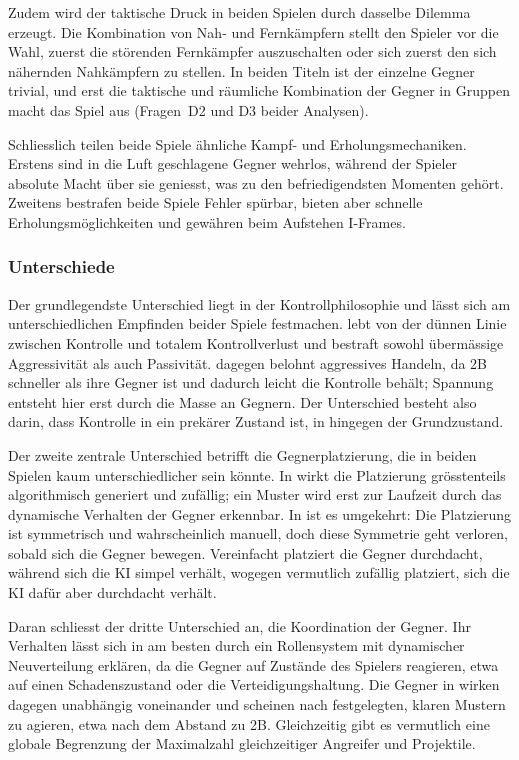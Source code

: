 \documentclass[../Main.tex]{subfiles}
\begin{document}
Zudem wird der taktische Druck in beiden Spielen durch dasselbe Dilemma erzeugt. Die Kombination von Nah- und Fernkämpfern stellt den Spieler vor die Wahl, zuerst die störenden Fernkämpfer auszuschalten oder sich zuerst den sich nähernden Nahkämpfern zu stellen. In beiden Titeln ist der einzelne Gegner trivial, und erst die taktische und räumliche Kombination der Gegner in Gruppen macht das Spiel aus (Fragen~D2 und D3 beider Analysen).

Schliesslich teilen beide Spiele ähnliche Kampf- und Erholungsmechaniken. Erstens sind in die Luft geschlagene Gegner wehrlos, während der Spieler absolute Macht über sie geniesst, was zu den befriedigendsten Momenten gehört. Zweitens bestrafen beide Spiele Fehler spürbar, bieten aber schnelle Erholungsmöglichkeiten und gewähren beim Aufstehen I-Frames.

\subsubsection{Unterschiede}

Der grundlegendste Unterschied liegt in der Kontrollphilosophie und lässt sich am unterschiedlichen Empfinden beider Spiele festmachen.  lebt von der dünnen Linie zwischen Kontrolle und totalem Kontrollverlust und bestraft sowohl übermässige Aggressivität als auch Passivität.  dagegen belohnt aggressives Handeln, da 2B schneller als ihre Gegner ist und dadurch leicht die Kontrolle behält; Spannung entsteht hier erst durch die Masse an Gegnern. Der Unterschied besteht also darin, dass Kontrolle in  ein prekärer Zustand ist, in  hingegen der Grundzustand.

Der zweite zentrale Unterschied betrifft die Gegnerplatzierung, die in beiden Spielen kaum unterschiedlicher sein könnte. In  wirkt die Platzierung grösstenteils algorithmisch generiert und zufällig; ein Muster wird erst zur Laufzeit durch das dynamische Verhalten der Gegner erkennbar. In  ist es umgekehrt: Die Platzierung ist symmetrisch und wahrscheinlich manuell, doch diese Symmetrie geht verloren, sobald sich die Gegner bewegen. Vereinfacht platziert  die Gegner durchdacht, während sich die KI simpel verhält, wogegen  vermutlich zufällig platziert, sich die KI dafür aber durchdacht verhält.

Daran schliesst der dritte Unterschied an, die Koordination der Gegner. Ihr Verhalten lässt sich in  am besten durch ein Rollensystem mit dynamischer Neuverteilung erklären, da die Gegner auf Zustände des Spielers reagieren, etwa auf einen Schadenszustand oder die Verteidigungshaltung. Die Gegner in  wirken dagegen unabhängig voneinander und scheinen nach festgelegten, klaren Mustern zu agieren, etwa nach dem Abstand zu 2B. Gleichzeitig gibt es vermutlich eine globale Begrenzung der Maximalzahl gleichzeitiger Angreifer und Projektile.
\end{document}
